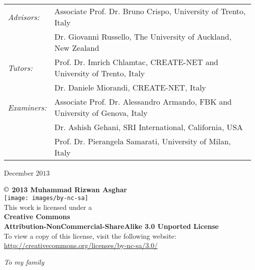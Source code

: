 \documentclass[epsfig,a4paper,11pt,titlepage]{book}
\newenvironment{license}
  {\clearpage           \thispagestyle{empty}\vspace*{\stretch{3}}\raggedright          }
  {\par \vspace{\stretch{1}} \clearpage           }
\newenvironment{dedication}
  {\clearpage           \thispagestyle{empty}\vspace*{\stretch{1}}\itshape             \raggedleft          }
  {\par \vspace{\stretch{3}} \clearpage           }
\newcommand{\clearemptydoublepage}{\newpage{\pagestyle{empty}\cleardoublepage}}
\numberwithin{algorithm}{chapter}
\newenvironment{changemargin}[3]{\begin{list}{}{\setlength{\topsep}{0pt}\setlength{\leftmargin}{#1}\setlength{\rightmargin}{#2}\setlength{\topmargin}{#3}\setlength{\listparindent}{\parindent}\setlength{\itemindent}{\parindent}\setlength{\parsep}{\parskip}}\item[]}{\end{list}}
\begin{document}
\begin{changemargin}{-7mm}{-7mm}{0mm}
\begin{center}
{
\large
\begin{tabular}{ll}
\textit{Advisors:} & 
Associate Prof. Dr. Bruno Crispo, University of Trento, Italy \vspace{1mm} \\
& Dr. Giovanni Russello, The University of Auckland, New Zealand \vspace{1mm} \\
\textit{Tutors:} & 
Prof. Dr. Imrich Chlamtac, CREATE-NET and University of Trento, Italy \vspace{1mm} \\
& Dr. Daniele Miorandi, CREATE-NET, Italy \vspace{1mm} \\
\textit{Examiners:}
& Associate Prof. Dr. Alessandro Armando, FBK and University of Genova, Italy \vspace{1mm} \\
& Dr. Ashish Gehani, SRI International, California, USA \vspace{1mm} \\
& Prof. Dr. Pierangela Samarati, University of Milan, Italy
\end{tabular}
}

\hrulefill

\normalsize
December $2013$
\end{center}
\end{changemargin}

\newpage
\clearemptydoublepage
\thispagestyle{empty}
\begin{license}
\textbf{$\copyright$ 2013 Muhammad Rizwan Asghar} \\
\vspace{4mm}
\texttt{[image: images/by-nc-sa]} \\
\vspace{2mm}
This work is licensed under a \\ 
\vspace{2mm}
\textbf{Creative Commons \\ Attribution-NonCommercial-ShareAlike 3.0 Unported License} \\
\vspace{2mm}
To view a copy of this license, visit the following website: \\
\url{http://creativecommons.org/licenses/by-nc-sa/3.0/}
\end{license}

\newpage
\clearemptydoublepage
\thispagestyle{empty}
\begin{dedication}
To my family
\end{dedication}
\end{document}
